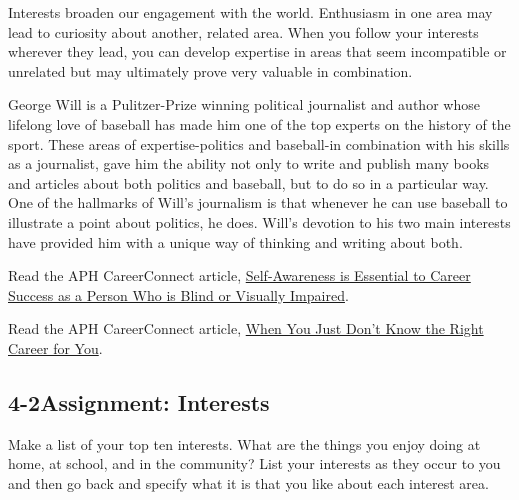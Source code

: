 Interests broaden our engagement with the world. Enthusiasm in one area may lead to curiosity about another, related area. When you follow your interests wherever they lead, you can develop expertise in areas that seem incompatible or unrelated but may ultimately prove very valuable in combination.

George Will is a Pulitzer-Prize winning political journalist and author whose lifelong love of baseball has made him one of the top experts on the history of the sport. These areas of expertise-politics and baseball-in combination with his skills as a journalist, gave him the ability not only to write and publish many books and articles about both politics and baseball, but to do so in a particular way. One of the hallmarks of Will's journalism is that whenever he can use baseball to illustrate a point about politics, he does. Will's devotion to his two main interests have provided him with a unique way of thinking and writing about both.

Read the APH CareerConnect article, \href{https://aphconnectcenter.org/careerconnect-blog/self-awareness-is-essential-to-career-success/}{Self-Awareness is Essential to Career Success as a Person Who is Blind or Visually Impaired}.

Read the APH CareerConnect article, \href{https://test.aphcareerconnect.org/blog/careerconnect-blog/when-you-just-dont-know-the-right-career-for-you-as-a-person-who-is-blind-or-visually-impaired/}{When You Just Don't Know the Right Career for You}.

\pagebreak \subsection*{4-2\quad Assignment: Interests}
Make a list of your top ten interests. What are the things you enjoy doing at home, at school, and in the community? List your interests as they occur to you and then go back and specify what it is that you like about each interest area.

